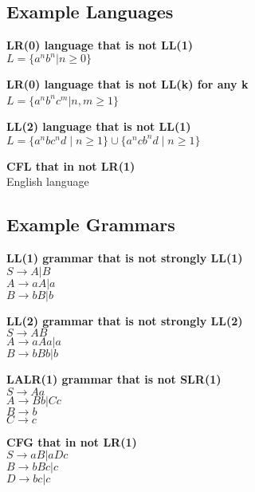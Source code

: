 
\subsection{Example Languages}
\textbf{LR(0) language that is not LL(1)}\\
    $L = \{a^n b^n | n \geq 0\}$

\textbf{LR(0) language that is not LL(k) for any k}\\
$L = \{a^n b^n c^m | n, m \geq 1\} $\

\textbf{LL(2) language that is not LL(1)}\\
$L = \{ a^n b c^n d \mid n \geq 1 \} \cup \{ a^n c b^n d \mid n \geq 1 \}$

\textbf{CFL that in not LR(1)}\\
    English language

\subsection{Example Grammars}
\textbf{LL(1) grammar that is not strongly LL(1)}\\
    $S \rightarrow A | B$\\
    $A \rightarrow aA | a$\\
    $B \rightarrow bB | b$

\textbf{LL(2) grammar that is not strongly LL(2)}\\
    $S \rightarrow A B$\\
    $A \rightarrow a A a | a$\\
    $B \rightarrow b B b | b$

\textbf{LALR(1) grammar that is not SLR(1)}\\
    $S \rightarrow A a$\\
    $A \rightarrow B b | C c$\\
    $B \rightarrow b$\\
    $C \rightarrow c$

\textbf{CFG that in not LR(1)}\\
    $S\rightarrow aB|aDc$\\
    $B\rightarrow bBc|c$\\
    $D\rightarrow bc|c$

